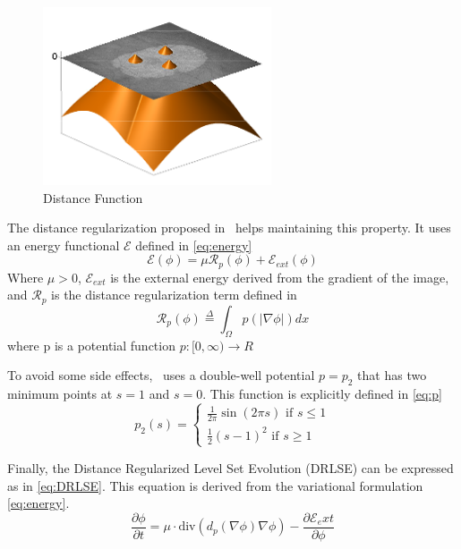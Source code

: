 \documentclass[a4paper,10pt]{article}
\begin{document}
\begin{figure}
\centering
\includegraphics[width=0.7\linewidth]{../results/level_set/dist-LSF}
\caption{Distance Function}
\label{fig:dist-LSF}
\end{figure}

The distance regularization proposed in~\cite{li2010distance} helps maintaining this property. It uses an energy functional $\mathcal{E}$ defined in \ref{eq:energy}
\begin{equation}
\mathcal{E}(\phi)=\mu\mathcal{R}_p(\phi)+\mathcal{E}_{ext}(\phi)
\label{eq:energy}
\end{equation}
Where $\mu>0$, $\mathcal{E}_{ext}$ is the external energy derived from the gradient of the image, and $\mathcal{R}_p$ is the distance regularization term defined in 
\begin{equation}
\mathcal{R}_p(\phi) \stackrel{\Delta}{=} \int_{\Omega}^{}p(|\nabla\phi|)dx
\end{equation}
where p is a potential function $p : [0,\infty) \rightarrow R$

To avoid some side effects,~\cite{li2010distance} uses a double-well potential $p=p_2$ that has two minimum points at $s=1$ and $s=0$. This function is explicitly defined in \ref{eq:p}
\begin{equation}
p_2(s)= 
\begin{cases}
\frac{1}{2 \pi} \sin(2\pi s) \text{ if } s \leq 1 \\
\frac{1}{2} (s-1)^2 \text{ if } s \geq 1
\end{cases}
\label{eq:p}
\end{equation}

Finally, the Distance Regularized Level Set Evolution (DRLSE) can be expressed as in \ref{eq:DRLSE}. This equation is derived from the variational formulation \ref{eq:energy}.
\begin{equation}
\frac{\partial \phi}{\partial t} = \mu \cdot \text{div} (d_p(\nabla\phi)\nabla\phi) - \frac{\partial \mathcal{E}_ext}{\partial\phi} 
\label{eq:DRLSE}
\end{equation}
\end{document}
